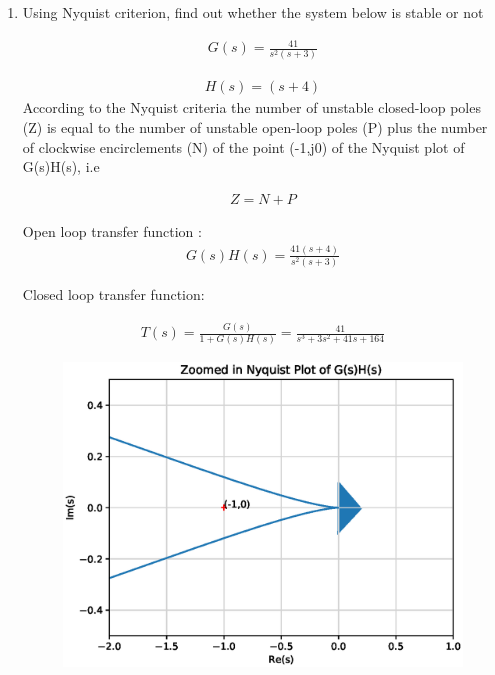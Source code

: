 \begin{enumerate}[label=\thesection.\arabic*.,ref=\thesection.\theenumi]
\item Using Nyquist criterion, find out whether the system below is stable or not

\begin{align}
    G(s)= \frac{41}{s^2(s+3)}
    \label{eq:ee18btech11041_1}
\end{align}

\begin{align}
    H(s)= (s+4)
    \label{eq:ee18btech11041_2}
\end{align}
\solution 
According to the Nyquist criteria the number of unstable closed-loop poles (Z) is equal to the number of unstable open-loop poles (P) plus the number of clockwise encirclements (N) of the point (-1,j0) of the Nyquist plot of G(s)H(s), i.e

\begin{align}
    Z=N+P
    \label{eq:ee18btech11041_3}
\end{align}

Open loop transfer function :
\begin{align}
    G(s)H(s)=\frac{41(s+4)}{s^2(s+3)}
    \label{eq:ee18btech11041_4}
\end{align}

Closed loop transfer function:

\begin{align}
   T(s)= \frac{G(s)}{1+G(s)H(s)}=\frac{41}{s^3+3s^2+41s+164}
\end{align}


\begin{figure}[!h]
    \includegraphics[width=\columnwidth]{./figs/ee18btech11041_1.eps}
    \caption{}
    \label{fig:ee18btech11041_fig1}
\end{figure}



\end{enumerate}
